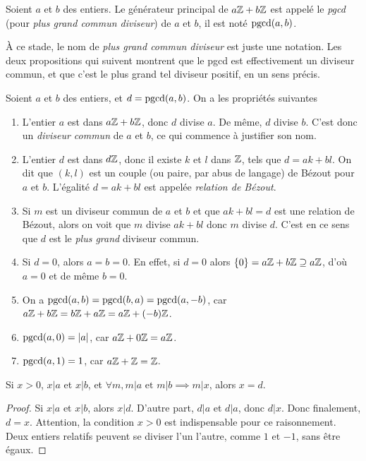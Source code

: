\begin{definition}
Soient $a$ et $b$ des entiers. Le générateur principal de $a\mathbb{Z}+b\mathbb{Z}$ est appelé le \emph{pgcd} (pour \emph{plus grand commun diviseur}) de $a$ et $b$, il est noté $\operatorname{pgcd}(a,b)$.
\end{definition}

\begin{remarque}
À ce stade, le nom de \emph{plus grand commun diviseur} est juste une notation. Les deux propositions qui suivent montrent que le pgcd est effectivement un diviseur commun, et que c'est le plus grand tel diviseur positif, en un sens précis.
\end{remarque}

\begin{proposition}
Soient $a$ et $b$ des entiers, et $d=\operatorname{pgcd}(a,b)$.
On a les propriétés suivantes
\begin{enumerate}
\item L'entier $a$ est dans $a\mathbb{Z}+b\mathbb{Z}$, donc $d$ divise $a$. De même, $d$ divise $b$. C'est donc un \emph{diviseur commun} de $a$ et $b$, ce qui commence à justifier son nom.
\item L'entier $d$ est dans $d\mathbb{Z}$, donc il existe $k$ et $l$ dans $\mathbb{Z}$, tels que $d = ak+bl$. On dit que $(k,l)$ est un couple (ou paire, par abus de langage) de Bézout pour $a$ et $b$. L'égalité $d=ak+bl$ est appelée \emph{relation de Bézout}.
\item Si $m$ est un diviseur commun de $a$ et $b$ et que $ak+bl=d$ est une relation de Bézout, alors on voit que $m$ divise $ak+bl$ donc $m$ divise $d$. C'est en ce sens que $d$ est le \emph{plus grand} diviseur commun.
\item Si $d=0$, alors $a=b=0$. En effet, si $d=0$ alors $\{0\}=a\mathbb{Z}+b\mathbb{Z}\supseteq a\mathbb{Z}$, d'où $a=0$ et de même $b=0$.
\item On a $\operatorname{pgcd}(a,b)=\operatorname{pgcd}(b,a) = \operatorname{pgcd}(a,-b)$, car $a\mathbb{Z}+b\mathbb{Z} = b\mathbb{Z}+a\mathbb{Z}=a\mathbb{Z}+(-b)\mathbb{Z}$.
\item $\operatorname{pgcd}(a,0)=|a|$, car $a\mathbb{Z}+0\mathbb{Z} = a\mathbb{Z}$.
\item $\operatorname{pgcd}(a,1)=1$, car $a\mathbb{Z}+\mathbb{Z} = \mathbb{Z}$.
\end{enumerate}
\end{proposition}

\begin{proposition}
Si $x>0$, $x|a$ et $x|b$, et $\forall m, m|a \text{ et } m|b \implies m|x$, alors $x=d$.
\end{proposition}
\begin{proof}
Si $x|a$ et $x|b$, alors $x|d$. D'autre part, $d|a$ et $d|a$, donc $d|x$. Donc finalement, $d=x$.
Attention, la condition $x>0$ est indispensable pour ce raisonnement. Deux entiers relatifs peuvent se diviser l'un l'autre, comme $1$ et $-1$, sans être égaux.
\end{proof}

